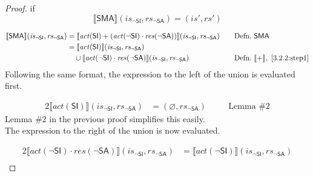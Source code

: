 \documentclass[12pt, letterpaper]{article}
\let\emptyset\varnothing
\newcommand\interp[1]{\llbracket #1 \rrbracket}
\begin{document}
 \begin{proof}
 if
     \[
     \interp{ \mathsf{SMA} } (\mathit{is_{\mathsf{\neg SI}}}, \mathit{rs_{\mathsf{\neg SA}}})
     =
     (\mathit{is}', \mathit{rs}')
     \]
 \par\nobreak
 {\fontsize{10pt}{12pt}\selectfont
 \begin{alignat}{2}
     \setcounter{equation}{0}
     \label{3.2.2:step1}
     \interp{ \mathsf{SMA} } (\mathit{is_{\mathsf{\neg SI}}}, \mathit{rs_{\mathsf{\neg SA}}})
     &=
     \interp{ \mathit{act}(\mathsf{SI}) +
     (\mathit{act}(\neg\mathsf{SI}) \cdot
      \mathit{res}(\neg\mathsf{SA}))  } (\mathit{is_{\mathsf{\neg SI}}}, \mathit{rs_{\mathsf{\neg SA}}})
     &&\quad \text{Defn.}\ \mathsf{SMA}
     \\
     \label{3.2.2:step2}
     &=
     \interp{ \mathit{act}(\mathsf{SI}) } (\mathit{is_{\mathsf{\neg SI}}}, \mathit{rs_{\mathsf{\neg SA}}}) \\
     \nonumber
     &\quad \cup %
     \interp{ \mathit{act}(\neg\mathsf{SI}) \cdot
      \mathit{res}(\neg\mathsf{SA}) } (\mathit{is_{\mathsf{\neg SI}}}, \mathit{rs_{\mathsf{\neg SA}}})
     &&\quad \text{Defn.}\ \interp{+},\ \ref{3.2.2:step1}
 \end{alignat}
 }%
     Following the same format, the expression to the left of the union is evaluated first.
 \par\nobreak
 {\fontsize{10pt}{12pt}\selectfont
 \begin{alignat}{2}
     \label{3.2.2:step3}
     \interp{ \mathit{act}(\mathsf{SI}) } (\mathit{is_{\mathsf{\neg SI}}}, \mathit{rs_{\mathsf{\neg SA}}})
     &=
     (\emptyset, \mathit{rs_{\mathsf{\neg SA}}})
     &&\quad \text{Lemma \#2}
 \end{alignat}
 }%
     Lemma \#2 in the previous proof simplifies this easily.\\
     The expression to the right of the union is now evaluated.
 \par\nobreak
 {\fontsize{10pt}{12pt}\selectfont
 \begin{alignat}{2}
     \label{3.2.2:step4}
     \interp{ \mathit{act}(\neg\mathsf{SI}) \cdot
      \mathit{res}(\neg\mathsf{SA}) } (\mathit{is_{\mathsf{\neg SI}}}, \mathit{rs_{\mathsf{\neg SA}}})
     &=
     \interp{ \mathit{act}(\neg\mathsf{SI}) } (\mathit{is_{\mathsf{\neg SI}}}, \mathit{rs_{\mathsf{\neg SA}}})\\ \nonumber

\end{alignat}}
\end{proof}
\end{document}
